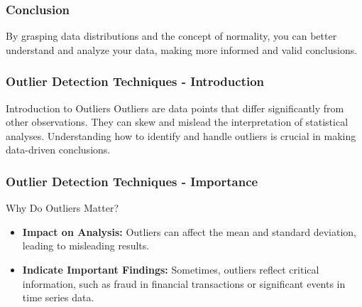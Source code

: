 \documentclass[aspectratio=169]{beamer}
\begin{document}
\begin{frame}[fragile]
    \frametitle{Conclusion}
    By grasping data distributions and the concept of normality, you can better understand and analyze your data, making more informed and valid conclusions.
\end{frame}

\begin{frame}[fragile]
    \frametitle{Outlier Detection Techniques - Introduction}
    \begin{block}{Introduction to Outliers}
        Outliers are data points that differ significantly from other observations. They can skew and mislead the interpretation of statistical analyses. Understanding how to identify and handle outliers is crucial in making data-driven conclusions.
    \end{block}
\end{frame}

\begin{frame}[fragile]
    \frametitle{Outlier Detection Techniques - Importance}
    \begin{block}{Why Do Outliers Matter?}
        \begin{itemize}
            \item \textbf{Impact on Analysis:} Outliers can affect the mean and standard deviation, leading to misleading results.
            \item \textbf{Indicate Important Findings:} Sometimes, outliers reflect critical information, such as fraud in financial transactions or significant events in time series data.
        \end{itemize}
    \end{block}
\end{frame}
\end{document}
